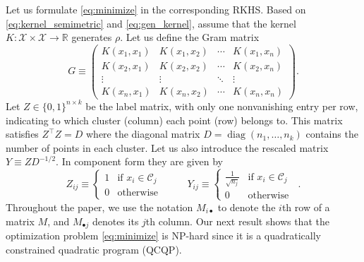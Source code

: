 \documentclass[aps,preprint,nofootinbib,floatfix]{revtex4-1}
\DeclareMathOperator{\diag}{diag}
\newcommand\kk{K}
\newcommand\C{{\mathcal{C}}}
\newcommand\Zt{Y}
\begin{document}
Let us formulate \eqref{eq:minimize} in the corresponding
RKHS. Based on \eqref{eq:kernel_semimetric} and \eqref{eq:gen_kernel}, 
assume that the kernel $\kk: \mathcal{X} \times \mathcal{X} \to \mathbb{R}$ 
generates $\rho$.  Let us define  the Gram matrix
\begin{equation}
\label{eq:kernel_matrix}
G \equiv \begin{pmatrix}
\kk(x_1,x_1) & \kk(x_1,x_2) & \dotsm & \kk(x_1,x_n) \\
\kk(x_2,x_1) & \kk(x_2,x_2) & \dotsm & \kk(x_2,x_n) \\
\vdots & \vdots & \ddots  & \vdots \\
\kk(x_n,x_1) & \kk(x_n,x_2) & \dotsm & \kk(x_n,x_n) 
\end{pmatrix} .
\end{equation}
Let $Z \in \{ 0,1 \}^{n\times k}$ be the label matrix, 
with only one nonvanishing entry per row, 
indicating to which cluster (column)
each point (row) belongs to. This matrix satisfies
$Z^\top Z = D$ where the diagonal matrix 
$D = \diag( n_1,\dotsc, n_k )$  contains
the number of points in each cluster. Let us also introduce the rescaled
matrix  $Y \equiv Z D^{-1/2}$. In component form they are given by
\begin{equation}
\label{eq:label_matrix}
Z_{ij} \equiv \begin{cases}
1 & \mbox{if $x_i \in \C_j$ } \\
0 & \mbox{otherwise}
\end{cases} \qquad
\Zt_{ij} \equiv \begin{cases}
\tfrac{1}{\sqrt{n_j}} & \mbox{if $x_i \in \C_j$ } \\
0 & \mbox{otherwise}
\end{cases} .
\end{equation}
Throughout the paper, we use the notation $M_{i\bullet}$ to denote
the $i$th row of a matrix $M$, and $M_{\bullet j}$ denotes its $j$th column.
Our next result shows that the optimization problem \eqref{eq:minimize}
is NP-hard since
it is a quadratically constrained quadratic program (QCQP).
\end{document}
